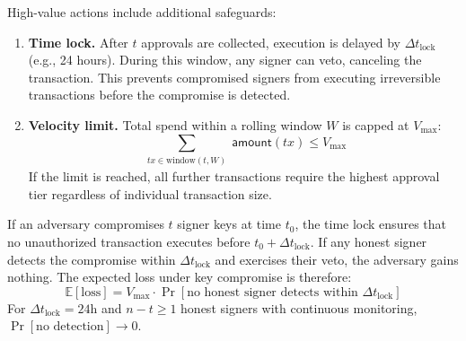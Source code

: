 High-value actions include additional safeguards:

\begin{enumerate}
    \item \textbf{Time lock.} After $t$ approvals are collected, execution
    is delayed by $\Delta t_{\text{lock}}$ (e.g., 24 hours). During this
    window, any signer can veto, canceling the transaction. This prevents
    compromised signers from executing irreversible transactions before
    the compromise is detected.

    \item \textbf{Velocity limit.} Total spend within a rolling window $W$
    is capped at $V_{\max}$:
    \begin{equation}
        \sum_{\substack{tx \in \text{window}(t, W)}} \mathsf{amount}(tx) \leq V_{\max}
    \end{equation}
    If the limit is reached, all further transactions require the highest
    approval tier regardless of individual transaction size.
\end{enumerate}

\begin{proposition}
If an adversary compromises $t$ signer keys at time $t_0$, the time lock
ensures that no unauthorized transaction executes before $t_0 + \Delta t_{\text{lock}}$.
If any honest signer detects the compromise within $\Delta t_{\text{lock}}$
and exercises their veto, the adversary gains nothing. The expected loss
under key compromise is therefore:
\begin{equation}
    \mathbb{E}[\text{loss}] = V_{\max} \cdot \Pr[\text{no honest signer detects within } \Delta t_{\text{lock}}]
\end{equation}
For $\Delta t_{\text{lock}} = 24\text{h}$ and $n - t \geq 1$ honest signers
with continuous monitoring, $\Pr[\text{no detection}] \to 0$.
\end{proposition}

